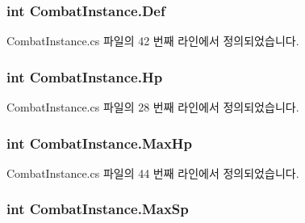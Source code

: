 \subsubsection[{\texorpdfstring{Def}{Def}}]{\setlength{\rightskip}{0pt plus 5cm}int Combat\+Instance.\+Def\hspace{0.3cm}{\ttfamily [get]}}\hypertarget{class_combat_instance_ab52acfd86a70be3647d2f092e6816190}{}\label{class_combat_instance_ab52acfd86a70be3647d2f092e6816190}


Combat\+Instance.\+cs 파일의 42 번째 라인에서 정의되었습니다.

\subsubsection[{\texorpdfstring{Hp}{Hp}}]{\setlength{\rightskip}{0pt plus 5cm}int Combat\+Instance.\+Hp\hspace{0.3cm}{\ttfamily [get]}}\hypertarget{class_combat_instance_ae4682b727ea05a59141f747341877eb6}{}\label{class_combat_instance_ae4682b727ea05a59141f747341877eb6}


Combat\+Instance.\+cs 파일의 28 번째 라인에서 정의되었습니다.

\subsubsection[{\texorpdfstring{Max\+Hp}{MaxHp}}]{\setlength{\rightskip}{0pt plus 5cm}int Combat\+Instance.\+Max\+Hp\hspace{0.3cm}{\ttfamily [get]}}\hypertarget{class_combat_instance_a33c5218456253d1a5c457fe6364b10d7}{}\label{class_combat_instance_a33c5218456253d1a5c457fe6364b10d7}


Combat\+Instance.\+cs 파일의 44 번째 라인에서 정의되었습니다.

\subsubsection[{\texorpdfstring{Max\+Sp}{MaxSp}}]{\setlength{\rightskip}{0pt plus 5cm}int Combat\+Instance.\+Max\+Sp\hspace{0.3cm}{\ttfamily [get]}}\hypertarget{class_combat_instance_ad1d6d4d72223021bd0130b069437463d}{}\label{class_combat_instance_ad1d6d4d72223021bd0130b069437463d}


